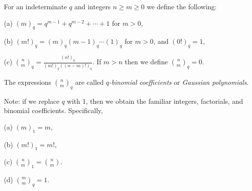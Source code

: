 \documentclass{article}
\begin{document}
For an indeterminate $q$ and integers $n \ge m \ge 0$
we define the following: \par
(a) $(m)_q = q^{m-1} + q^{m-2} + \cdots + 1$ for $m>0$, \par
(b) $(m!)_q = (m)_q (m-1)_q \cdots (1)_q$ for $m>0$, and $(0!)_q = 1$, \par
(c) ${n \choose m}_q = \frac{(n!)_q}{(m!)_q ((n-m)!)_q}$.
If $m>n$ then we define ${n \choose m}_q=0$. \par
The expressions ${n \choose m}_q$ are called
{\it $q$-binomial coefficients} or {\it Gaussian polynomials}.\par
Note: if we replace $q$ with 1, then we obtain the familiar integers, factorials, and binomial coefficients.  Specifically,\par
(a) $(m)_1 = m$, \par
(b) $(m!)_1 = m!$, \par
(c) ${n \choose m}_1 = {n \choose m}$.\par
(d) ${m \choose m}_q=1$.
\end{document}
